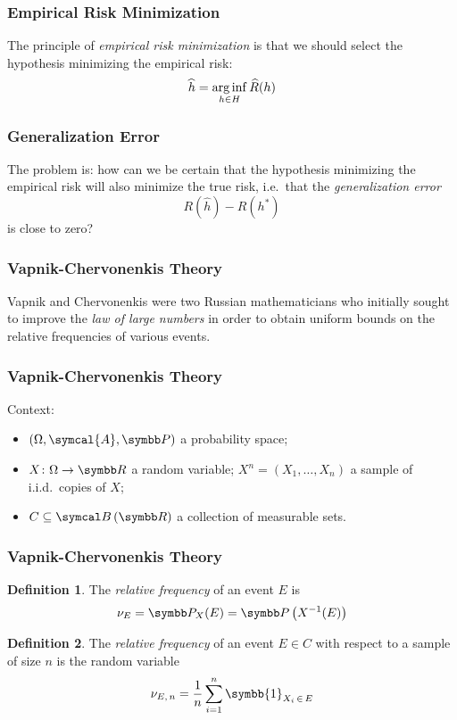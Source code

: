 \documentclass{beamer}
\theoremstyle{definition}
\newtheorem*{definition*}{Definition}
\begin{document}
\begin{frame}
\frametitle{Empirical Risk Minimization}

The principle of \emph{empirical risk minimization} is that we should select the hypothesis minimizing the empirical risk:
\[
    \widehat{h} = \operatorname*{arg\,inf}_{h \in H} \widehat{R}(h)
\]
\end{frame}

\begin{frame}
\frametitle{Generalization Error}

The problem is: how can we be certain that the hypothesis minimizing the empirical risk will also minimize the true risk, i.e.\ that the \emph{generalization error}
\[
    R\left(\widehat{h}\right) - R\left(h^*\right)
\]
is close to zero?
\end{frame}

\begin{frame}
\frametitle{Vapnik-Chervonenkis Theory}

Vapnik and Chervonenkis were two Russian mathematicians who initially sought to improve the \emph{law of large numbers} in order to obtain uniform bounds on the relative frequencies of various events.
\end{frame}

\begin{frame}
\frametitle{Vapnik-Chervonenkis Theory}

Context:
\begin{itemize}
    \item \(\left(\Omega, \symcal{A}, \probability\right)\) a probability space;
    \item \(X \colon \Omega \to \reals\) a random variable; \(X^n = (X_1, \dots, X_n)\) a sample of i.i.d.\ copies of \(X\);
    \item \(C \subseteq \borelsets{\reals}\) a collection of measurable sets.
\end{itemize}
\end{frame}

\begin{frame}
\frametitle{Vapnik-Chervonenkis Theory}

\begin{definition*}
The \emph{relative frequency} of an event \(E\) is
\[
    \nu_{E} = \probability_{X} (E) = \probability\left(X^{-1}(E)\right)
\]
\end{definition*}

\begin{definition*}
The \emph{relative frequency} of an event \(E \in C\) with respect to a sample of size \(n\) is the random variable
\[
    \nu_{E, \, n} = \frac{1}{n} \sum_{i = 1}^{n} \symbb{1}_{X_i \, \in \, E}
\]
\end{definition*}
\end{frame}
\end{document}
